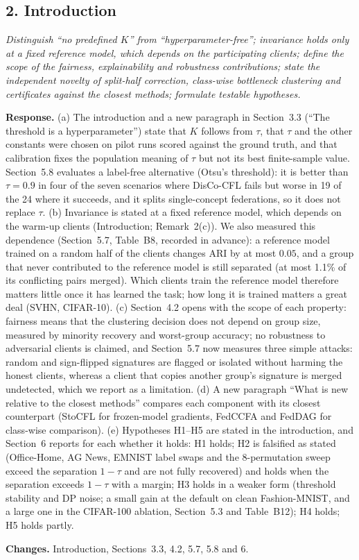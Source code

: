 \documentclass[11pt]{article}
\newenvironment{revcomment}{\par\medskip\noindent\begin{minipage}{\linewidth}\color{blue!45!black}\itshape}{\end{minipage}\par\smallskip}
\newcommand{\resp}{\par\noindent\textbf{Response.} }
\newcommand{\chg}{\par\noindent\textbf{Changes.} }
\begin{document}
\subsection*{2. Introduction}
\begin{revcomment}
Distinguish ``no predefined $K$'' from ``hyperparameter-free''; invariance holds only at a fixed reference model, which depends on the participating clients; define the scope of the fairness, explainability and robustness contributions; state the independent novelty of split-half correction, class-wise bottleneck clustering and certificates against the closest methods; formulate testable hypotheses.
\end{revcomment}
\resp (a) The introduction and a new paragraph in Section~3.3 (``The threshold is a hyperparameter'') state that $K$ follows from $\tau$, that $\tau$ and the other constants were chosen on pilot runs scored against the ground truth, and that calibration fixes the population meaning of $\tau$ but not its best finite-sample value. Section~5.8 evaluates a label-free alternative (Otsu's threshold): it is better than $\tau=0.9$ in four of the seven scenarios where DisCo-CFL fails but worse in 19 of the 24 where it succeeds, and it splits single-concept federations, so it does not replace $\tau$. (b) Invariance is stated at a fixed reference model, which depends on the warm-up clients (Introduction; Remark~2(c)). We also measured this dependence (Section~5.7, Table~B8, recorded in advance): a reference model trained on a random half of the clients changes ARI by at most $0.05$, and a group that never contributed to the reference model is still separated (at most 1.1\% of its conflicting pairs merged). Which clients train the reference model therefore matters little once it has learned the task; how long it is trained matters a great deal (SVHN, CIFAR-10). (c) Section~4.2 opens with the scope of each property: fairness means that the clustering decision does not depend on group size, measured by minority recovery and worst-group accuracy; no robustness to adversarial clients is claimed, and Section~5.7 now measures three simple attacks: random and sign-flipped signatures are flagged or isolated without harming the honest clients, whereas a client that copies another group's signature is merged undetected, which we report as a limitation. (d) A new paragraph ``What is new relative to the closest methods'' compares each component with its closest counterpart (StoCFL for frozen-model gradients, FedCCFA and FedDAG for class-wise comparison). (e) Hypotheses H1--H5 are stated in the introduction, and Section~6 reports for each whether it holds: H1 holds; H2 is falsified as stated (Office-Home, AG News, EMNIST label swaps and the 8-permutation sweep exceed the separation $1-\tau$ and are not fully recovered) and holds when the separation exceeds $1-\tau$ with a margin; H3 holds in a weaker form (threshold stability and DP noise; a small gain at the default on clean Fashion-MNIST, and a large one in the CIFAR-100 ablation, Section~5.3 and Table~B12); H4 holds; H5 holds partly.
\chg Introduction, Sections~3.3, 4.2, 5.7, 5.8 and 6.
\end{document}
